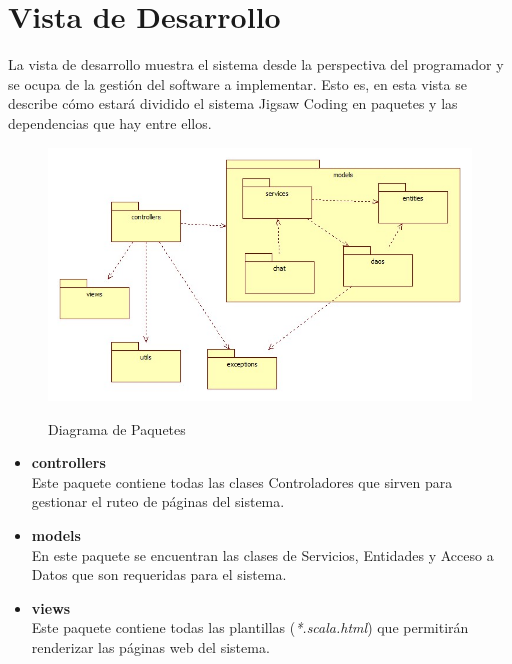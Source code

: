 \section{Vista de Desarrollo}
La vista de desarrollo muestra el sistema desde la perspectiva del programador y se ocupa de la gestión del software a implementar. Esto es, en esta vista se describe cómo estará dividido el sistema Jigsaw Coding en paquetes y las dependencias que hay entre ellos.
\begin{figure}[!h]
  \centering
  \includegraphics[scale=0.6]{figuras/sad/diagrama_de_paquetes.jpg}\\
  \caption{Diagrama de Paquetes}\label{fig:diagrama_de_paquetes}
\end{figure}
\begin{itemize}
  \item \textbf{controllers}\\Este paquete contiene todas las clases Controladores que sirven para gestionar el ruteo de páginas del sistema.
  \item \textbf{models}\\En este paquete se encuentran las clases de Servicios, Entidades y Acceso a Datos que son requeridas para el sistema.
  \item \textbf{views}\\Este paquete contiene todas las plantillas (\emph{*.scala.html}) que permitirán renderizar las páginas web del sistema.
\end{itemize}
\clearpage
